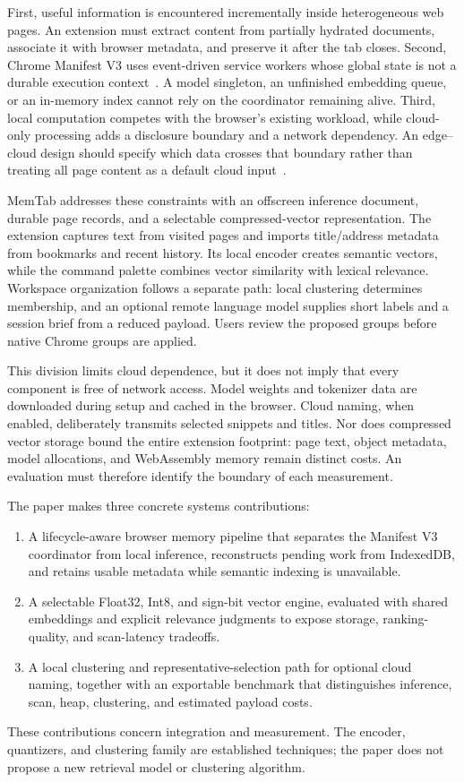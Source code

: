 \documentclass[conference]{IEEEtran}
\begin{document}
First, useful information is encountered incrementally inside heterogeneous
web pages. An extension must extract content from partially hydrated documents,
associate it with browser metadata, and preserve it after the tab closes.
Second, Chrome Manifest V3 uses event-driven service workers whose global
state is not a durable execution context~\cite{chromemv3}. A model singleton,
an unfinished embedding queue, or an in-memory index cannot rely on the
coordinator remaining alive. Third, local computation competes with the
browser's existing workload, while cloud-only processing adds a disclosure
boundary and a network dependency. An edge--cloud design should specify which
data crosses that boundary rather than treating all page content as a default
cloud input~\cite{shi2016edge}.

MemTab addresses these constraints with an offscreen inference document,
durable page records, and a selectable compressed-vector representation.
The extension captures text from visited pages and imports title/address
metadata from bookmarks and recent history. Its local encoder creates
semantic vectors, while the command palette combines vector similarity with
lexical relevance. Workspace organization follows a separate path:
local clustering determines membership, and an optional remote language
model supplies short labels and a session brief from a reduced payload.
Users review the proposed groups before native Chrome groups are applied.

This division limits cloud dependence, but it does not imply that every
component is free of network access. Model weights and tokenizer data are
downloaded during setup and cached in the browser. Cloud naming, when enabled,
deliberately transmits selected snippets and titles. Nor does compressed
vector storage bound the entire extension footprint: page text, object
metadata, model allocations, and WebAssembly memory remain distinct costs.
An evaluation must therefore identify the boundary of each measurement.

The paper makes three concrete systems contributions:
\begin{enumerate}
 \item A lifecycle-aware browser memory pipeline that separates the Manifest
 V3 coordinator from local inference, reconstructs pending work from
 IndexedDB, and retains usable metadata while semantic indexing is unavailable.
 \item A selectable Float32, Int8, and sign-bit vector engine, evaluated with
 shared embeddings and explicit relevance judgments to expose storage,
 ranking-quality, and scan-latency tradeoffs.
 \item A local clustering and representative-selection path for optional
 cloud naming, together with an exportable benchmark that distinguishes
 inference, scan, heap, clustering, and estimated payload costs.
\end{enumerate}
These contributions concern integration and measurement. The encoder,
quantizers, and clustering family are established techniques; the paper does
not propose a new retrieval model or clustering algorithm.
\end{document}
